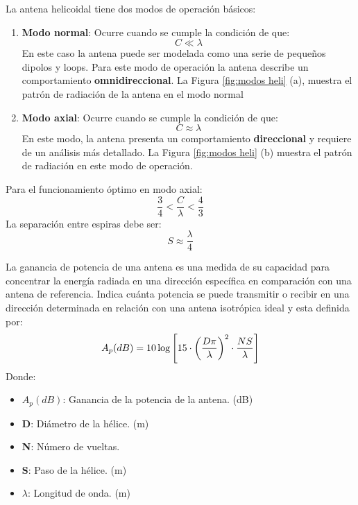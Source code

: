 \documentclass[
	12pt, %
	fleqn, %
	a4paper, %
	oneside, %
]{LegrandOrangeBook}
\begin{document}
La antena helicoidal tiene dos modos de operación básicos:
\begin{enumerate}
\item \textbf{Modo normal}: Ocurre cuando se cumple la condición de que:
\begin{equation}
C\ll\lambda
\end{equation}
En este caso la antena puede ser modelada como una serie de pequeños dipolos y loops. Para este modo de operación la antena describe un comportamiento \textbf{omnidireccional}. La Figura \ref{fig:modos heli} (a), muestra el patrón de radiación de la antena en el modo normal
\item \textbf{Modo axial}: Ocurre cuando se cumple la condición de que:
\begin{displaymath}
C\approx\lambda
\end{displaymath}
En este modo, la antena presenta un comportamiento \textbf{direccional} y requiere de un análisis más detallado. La Figura \ref{fig:modos heli} (b) muestra el patrón de radiación en este modo de operación.
\end{enumerate}
\begin{notation}
Para el funcionamiento óptimo en modo axial:
\begin{equation}
\frac{3}{4}<\frac{C}{\lambda}<\frac{4}{3}
\end{equation}
La separación entre espiras debe ser:
\begin{equation}
S\approx\frac{\lambda}{4}
\end{equation}
\end{notation}
\begin{definition}
La ganancia de potencia de una antena es una medida de su capacidad para concentrar la energía radiada en una dirección específica en comparación con una antena de referencia. Indica cuánta potencia se puede transmitir o recibir en una dirección determinada en relación con una antena isotrópica ideal y esta definida por:
\begin{equation}
A_p(dB)=10\log\left[15\cdot \left(\frac{D\pi}{\lambda}\right)^2\cdot\frac{NS}{\lambda}\right]
\end{equation}
Donde:
\begin{itemize}
\item $A_p(dB)$: Ganancia de la potencia de la antena. (dB)
\item \textbf{D}: Diámetro de la hélice. (m)
\item \textbf{N}: Número de vueltas.
\item \textbf{S}: Paso de la hélice. (m)
\item $\lambda$: Longitud de onda. (m)
\end{itemize}
\end{definition}
\end{document}
